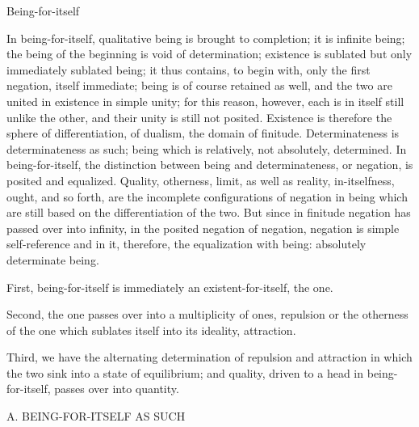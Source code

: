 Being-for-itself

In being-for-itself,
qualitative being is brought to completion;
it is infinite being;
the being of the beginning is void of determination;
existence is sublated but only immediately sublated being;
it thus contains, to begin with,
only the first negation, itself immediate;
being is of course retained as well,
and the two are united in existence in simple unity;
for this reason, however,
each is in itself still unlike the other,
and their unity is still not posited.
Existence is therefore the sphere of differentiation,
of dualism, the domain of finitude.
Determinateness is determinateness as such;
being which is relatively, not absolutely, determined.
In being-for-itself, the distinction
between being and determinateness,
or negation, is posited and equalized.
Quality, otherness, limit, as well as reality,
in-itselfness, ought, and so forth, are the
incomplete configurations of negation in being
which are still based on the differentiation of the two.
But since in finitude negation has passed over into infinity,
in the posited negation of negation,
negation is simple self-reference
and in it, therefore, the equalization with being:
absolutely determinate being.

First, being-for-itself is immediately
an existent-for-itself, the one.

Second, the one passes over
into a multiplicity of ones,
repulsion or the otherness of the one
which sublates itself into its ideality, attraction.

Third, we have the alternating
determination of repulsion and attraction
in which the two sink into a state of equilibrium;
and quality, driven to a head in being-for-itself,
passes over into quantity.

A. BEING-FOR-ITSELF AS SUCH

